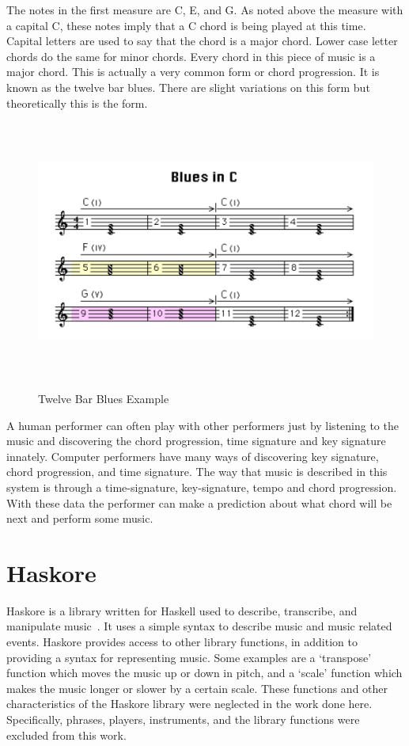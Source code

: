 \documentclass[12pt]{ucthesis}
\newcommand{\captionfonts}{\small\bf\ssp}
\begin{document}
The notes in the first measure are C, E, and G. As noted above the measure with a capital C, these notes imply that a C chord is being played at this time. Capital letters are used to say that the chord is a major chord. Lower case letter chords do the same for minor chords. Every chord in this piece of music is a major chord. This is actually a very common form or chord progression. It is known as the twelve bar blues. There are slight variations on this form but theoretically this is the form. 

\begin{figure}
\includegraphics[height=85mm]{blues-example.pdf}
\captionfonts
\caption[Twelve Bar Blues Example]{Twelve Bar Blues Example}
\label{fig:blues-example}
\end{figure}

A human performer can often play with other performers just by listening to the music and discovering the chord progression, time signature and key signature innately. Computer performers have many ways of discovering key signature, chord progression, and time signature. The way that music is described in this system is through a time-signature, key-signature, tempo and chord progression. With these data the performer can make a prediction about what chord will be next and perform some music.

\section{Haskore}
\label{rw:haskore}

Haskore is a library written for Haskell used to describe, transcribe, and manipulate music~\cite{Haskore}. It uses a simple syntax to describe music and music related events. Haskore provides access to other library functions, in addition to providing a syntax for representing music. Some examples are a `transpose' function which moves the music up or down in pitch, and a `scale' function which makes the music longer or slower by a certain scale. These functions and other characteristics of the Haskore library were neglected in the work done here. Specifically, phrases, players, instruments, and the library functions were excluded from this work. 
\end{document}
